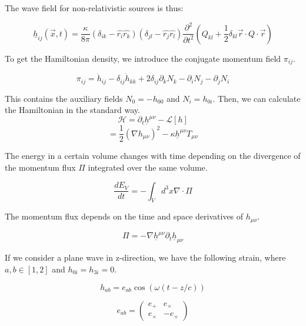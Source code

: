 The wave field for non-relativistic sources is thus:

\begin{equation}
    \underline{h}_{ij}(\vec{x}, t)=\frac{\kappa}{8\pi}(\delta_{ik}-\hat{r_i}\hat{r_k})(\delta_{jl}-\hat{r_j}\hat{r_l})\frac{\partial^2}{\partial t^2}\left(Q_{kl}+\frac{1}{2}\delta_{kl}\vec{r}\cdot Q \cdot \vec{r}\right)
\end{equation}

To get the Hamiltonian density, we introduce the conjugate momentum field $\pi_{ij}$.

\begin{equation}
    \pi_{ij}=\dot{h}_{ij}-\delta_{ij}\dot{h}_{kk}+2\delta_{ij}\partial_k
N_k-\partial_i N_j-\partial_j N_i 
\end{equation}

This contains the auxiliary fields $N_0=-h_{00}$ and $N_i=h_{0i}$.
Then, we can calculate the Hamiltonian in the standard way.
\begin{equation}
    \mathcal{H}=\partial_t \underline{h}^{\mu\nu}-\mathcal{L}[h]
\end{equation}
\begin{equation}
    =\frac{1}{2}(\nabla h_{\mu\nu})^2-\kappa \underline{h}^{\mu\nu}T_{\mu\nu}
\end{equation}

The energy in a certain volume changes with time depending on the divergence of the momentum flux $\Pi$ integrated over the same volume.

\begin{equation}
    \frac{dE_V}{dt}=-\int_V d^3x \nabla\cdot \Pi
\end{equation}

The momentum flux depends on the time and space derivatives of $h_{\mu\nu}$.

\begin{equation}
    \Pi=-\nabla \underline{h}^{\mu\nu}\partial_t \underline{h}_{\mu\nu}
\end{equation}

If we consider a plane wave in z-direction, we have the following strain, where $a,b \in [1, 2]$ and $h_{0i}=h_{3i}=0$.

\begin{equation}
    h_{ab} =e_{ab}\cos(\omega(t-z/c))
\end{equation}

\begin{equation}
    e_{ab}=
    \begin{pmatrix}
        e_+ & e_\times \\
        e_\times & -e_+
    \end{pmatrix}
\end{equation}

